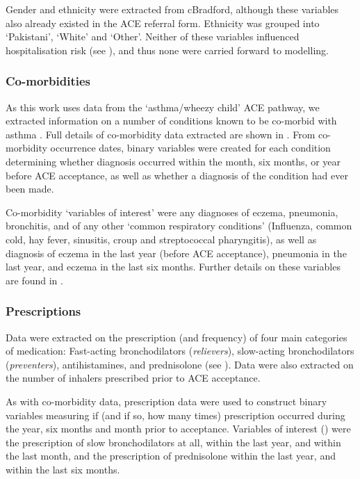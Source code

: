 Gender and ethnicity were extracted from cBradford, although these variables also already existed in the ACE referral form. Ethnicity was grouped into `Pakistani', `White' and `Other'. 
Neither of these variables influenced hospitalisation risk (see ), and thus none were carried forward to modelling.

\subsubsection{Co-morbidities}

As this work uses data from the `asthma/wheezy child' ACE pathway, we extracted information on a number of conditions known to be co-morbid with asthma \cite{Boulet2009}. Full details of co-morbidity data extracted are shown in . From co-morbidity occurrence dates, binary variables were created for each condition determining whether diagnosis occurred within the month, six months, or year before ACE acceptance, as well as whether a diagnosis of the condition had ever been made.

Co-morbidity `variables of interest' were any diagnoses of eczema, pneumonia, bronchitis, and of any other `common respiratory conditions' (Influenza, common cold, hay fever, sinusitis, croup and streptococcal pharyngitis), as well as diagnosis of eczema in the last year (before ACE acceptance), pneumonia in the last year, and eczema in the last six months. Further details on these variables are found in . 

\subsubsection{Prescriptions}
% 

Data were extracted on the prescription (and frequency) of four main categories of medication: Fast-acting bronchodilators (\textit{relievers}), slow-acting bronchodilators (\textit{preventers}), antihistamines, and prednisolone (see ). Data were also extracted on the number of inhalers prescribed prior to ACE acceptance.

As with co-morbidity data, prescription data were used to construct binary variables measuring if (and if so, how many times) prescription occurred during the year, six months and month prior to acceptance. Variables of interest () were the prescription of slow bronchodilators at all, within the last year, and within the last month, and the prescription of prednisolone within the last year, and within the last six months.

